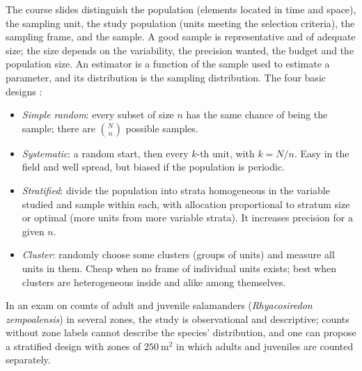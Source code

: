 The course slides distinguish the
population (elements located in time and
space), the sampling unit, the study
population (units meeting the selection
criteria), the sampling frame, and the
sample. A good sample is representative
and of adequate size; the size depends
on the variability, the precision wanted,
the budget and the population size. An
estimator is a function of the sample
used to estimate a parameter, and its
distribution is the sampling distribution.
The four basic designs
\cite[Section 1-5]{triola2012elementary}:
\begin{itemize}
\item \emph{Simple random}: every subset
of size $n$ has the same chance of being
the sample; there are
$\binom{N}{n}$ possible samples.
\item \emph{Systematic}: a random start,
then every $k$-th unit, with $k = N/n$.
Easy in the field and well spread, but
biased if the population is periodic.
\item \emph{Stratified}: divide the
population into strata homogeneous in the
variable studied and sample within each,
with allocation proportional to stratum
size or optimal (more units from more
variable strata). It increases precision
for a given $n$.
\item \emph{Cluster}: randomly choose
some clusters (groups of units) and
measure all units in them. Cheap when no
frame of individual units exists; best
when clusters are heterogeneous inside
and alike among themselves.
\end{itemize}

In an exam on counts of adult and
juvenile salamanders
(\emph{Rhyacosiredon zempoalensis}) in
several zones, the study is
observational and descriptive;
counts without zone labels cannot
describe the species' distribution, and
one can propose a stratified design with zones
of $250\ \mathrm{m}^2$ in which adults
and juveniles are counted separately.





